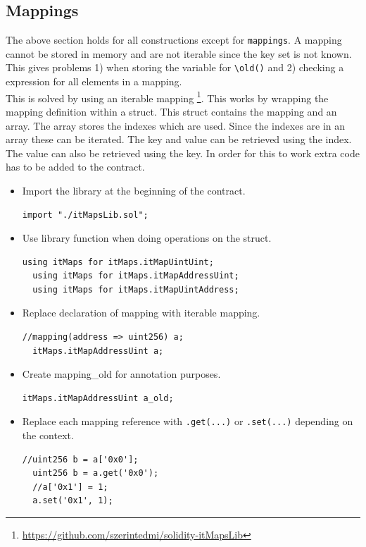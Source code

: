 \documentclass[a4paper]{article}
\begin{document}
\subsection{Mappings}
The above section holds for all constructions except for \texttt{mappings}. A mapping cannot be stored in memory and are not iterable since the key set is not known. This gives problems 1) when storing the variable for \texttt{\textbackslash old()} and 2) checking a expression for all elements in a mapping. \\
This is solved by using an iterable mapping \footnote{\url{https://github.com/szerintedmi/solidity-itMapsLib}}. This works by wrapping the mapping definition within a struct. This struct contains the mapping and an array. The array stores the indexes which are used. Since the indexes are in an array these can be iterated. The key and value can be retrieved using the index. The value can also be retrieved using the key. In order for this to work extra code has to be added to the contract.
\begin{itemize}
  \item Import the library at the beginning of the contract.
  \begin{lstlisting}[breaklines=true, language=Solidity ]
  import "./itMapsLib.sol";
  \end{lstlisting}
  \item Use library function when doing operations on the struct.
  \begin{lstlisting}[breaklines=true, language=Solidity ]
  using itMaps for itMaps.itMapUintUint;
  using itMaps for itMaps.itMapAddressUint;
  using itMaps for itMaps.itMapUintAddress;
  \end{lstlisting}
  \item Replace declaration of mapping with iterable mapping.
  \begin{lstlisting}[breaklines=true, language=Solidity ]
  //mapping(address => uint256) a;
  itMaps.itMapAddressUint a; 
  \end{lstlisting}
  \item Create mapping\_old for annotation purposes.
  \begin{lstlisting}[breaklines=true, language=Solidity ]
  itMaps.itMapAddressUint a_old; 
  \end{lstlisting}
  \item Replace each mapping reference with \texttt{.get(...)} or \texttt{.set(...)} depending on the context.
  \begin{lstlisting}[breaklines=true, language=Solidity ]
  //uint256 b = a['0x0'];
  uint256 b = a.get('0x0');
  //a['0x1'] = 1;
  a.set('0x1', 1); 
  \end{lstlisting}
\end{itemize}
\end{document}
